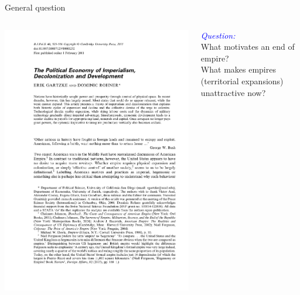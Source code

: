 \documentclass[xcolor=dvipsnames]{beamer}
\begin{document}
	\begin{frame}[fragile]{General question}
		\begin{columns}[T]
			\begin{column}{0.4\textwidth}
				\includegraphics[width=1\linewidth]{Gartzke2011cover.png}
			\end{column}
			
			\begin{column}{0.56\textwidth}
				\begin{center}
					\textit{\textcolor{blue}{Question:}}\\ \pause
					\bigskip		
					What motivates an end of empire?\\ \pause
					\bigskip
					What makes empires (territorial expansions) unattractive now?
				\end{center}
			\end{column}
		\end{columns}
	\end{frame}
	
\end{document}
